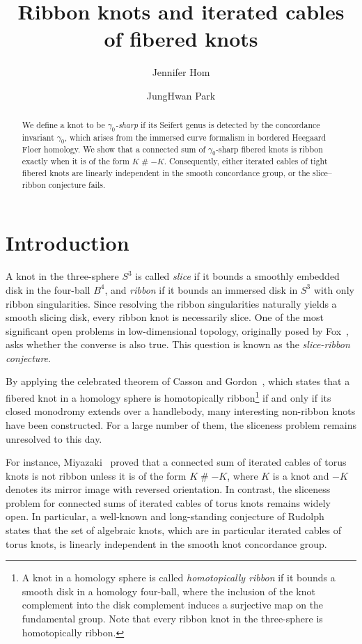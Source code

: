 \documentclass[11pt, reqno]{amsart}
\author[J.\ Hom]{Jennifer Hom}
\author[J.\ Park]{JungHwan Park}
\title{Ribbon knots and iterated cables of fibered knots}
\theoremstyle{definition}
\theoremstyle{remark}
\numberwithin{equation}{section}
\begin{document}
\begin{abstract}
We define a knot to be \emph{$\gamma_0$-sharp} if its Seifert genus is detected by the concordance invariant $\gamma_0$, which arises from the immersed curve formalism in bordered Heegaard Floer homology. We show that a connected sum of $\gamma_0$-sharp fibered knots is ribbon exactly when it is of the form $K \mathbin{\#} -K$.  Consequently, either iterated cables of tight fibered knots are linearly independent in the smooth concordance group, or the slice--ribbon conjecture fails.
\end{abstract}


\maketitle

\section{Introduction}
A knot in the three-sphere $S^3$ is called \emph{slice} if it bounds a smoothly embedded disk in the four-ball $B^4$, and \emph{ribbon} if it bounds an immersed disk in $S^3$ with only ribbon singularities. Since resolving the ribbon singularities naturally yields a smooth slicing disk, every ribbon knot is necessarily slice. One of the most significant open problems in low-dimensional topology, originally posed by Fox~{\cite[Problem 25]{Fox:1961}}, asks whether the converse is also true. This question is known as the \emph{slice-ribbon conjecture}. 

By applying the celebrated theorem of Casson and Gordon~\cite{Casson-Gordon:1983}, which states that a fibered knot in a homology sphere is homotopically ribbon\footnote{A knot in a homology sphere is called \emph{homotopically ribbon} if it bounds a smooth disk in a homology four-ball, where the inclusion of the knot complement into the disk complement induces a surjective map on the fundamental group. Note that every ribbon knot in the three-sphere is homotopically ribbon.}  if and only if its closed monodromy extends over a handlebody, many interesting non-ribbon knots have been constructed. For a large number of them, the sliceness problem remains unresolved to this day.









For instance, Miyazaki~\cite{Miyazaki:1994} proved that a connected sum of iterated cables of torus knots is not ribbon unless it is of the form $K \mathbin{\#} -K$, where $K$ is a knot and $-K$ denotes its mirror image with reversed orientation. In contrast, the sliceness problem for connected sums of iterated cables of torus knots remains widely open. In particular, a well-known and long-standing conjecture of Rudolph~\cite{Rudolph:1976} states that the set of algebraic knots, which are in particular iterated cables of torus knots, is linearly independent in the smooth knot concordance group.
\end{document}
